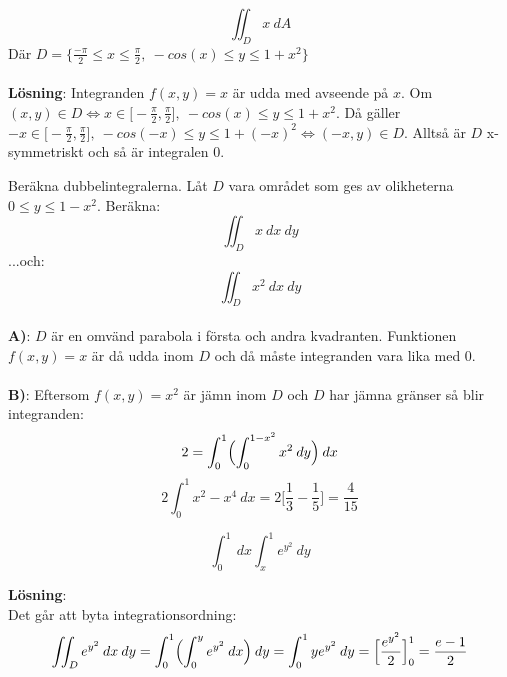 \documentclass{report}
\begin{document}
\pagebreak
{}
{
\begin{equation*}
\iint_{D}^{} x \: dA 
\end{equation*}
Där $ D = \{ \frac{-\pi}{2} \le x \le \frac{\pi}{2}, \: -cos(x) \le y \le 1 + x^2 \} $ \\\\

\textbf{Lösning}:
Integranden $ f(x,y) = x$  är udda med avseende på $ x $. Om $ (x,y) \in D \iff x \in \bigl[ - \frac{\pi}{2}, \frac{\pi}{2}   \bigr], \: -cos(x) \le y \le 1 + x^2 $. Då gäller $ - x \in \bigl[ - \frac{\pi}{2} , \frac{\pi}{2}   \bigr], \: -cos(-x) \le y \le 1 + (-x)^2 \iff (-x,y) \in D $. Alltså är $ D $ x-symmetriskt och så är integralen 0.   
}

\qs{}
{
Beräkna dubbelintegralerna. Låt $ D $ vara området som ges av olikheterna $ 0 \le y \le 1 - x^2 $. Beräkna:
\begin{equation*}
\iint_{D}^{} x \: dx   \: dy
\end{equation*}
...och:
\begin{equation*}
\iint_{D}^{} x^2 \: dx   \: dy 
\end{equation*}
}
\sol\\
\textbf{A)}: $ D $ är en omvänd parabola i första och andra kvadranten. Funktionen $ f(x,y) = x $ är då udda inom $ D $ och då måste integranden vara lika med 0.\\\\

\noindent
\textbf{B)}: Eftersom $ f(x,y) = x^2 $ är jämn inom $ D $ och $ D $ har jämna gränser så blir integranden:
\begin{equation*}
2 = \int_{0}^{1} \Bigl( \int_{0}^{1-x^2} x^2 \: dy  \Bigr)  \: dx 
\end{equation*}
\begin{equation*}
2\int_{0}^{1} x^2-x^4  \: dx = 2\bigl[ \frac{1}{3} - \frac{1}{5}  \bigr] = \frac{4}{15} 
\end{equation*}

\vspace{20pt}
{
\begin{equation*}
	\int_{0}^{1}  \: dx \int_{x}^{1} e^{y^2} \: dy  
\end{equation*}

\textbf{Lösning}:\\
Det går att byta integrationsordning:
\begin{equation*}
	\iint_{D}^{} e^{y^2} \: dx   \: dy = \int_{0}^{1} \Bigl( \int_{0}^{y} e^{y^2} \: dx  \Bigr)  \: dy = \int_{0}^{1} ye^{y^2} \: dy = \Bigl[ \frac{e^{y^2}}{2}   \Bigr]_{0}^{1} = \frac{e-1}{2}  
\end{equation*}
}
\end{document}
